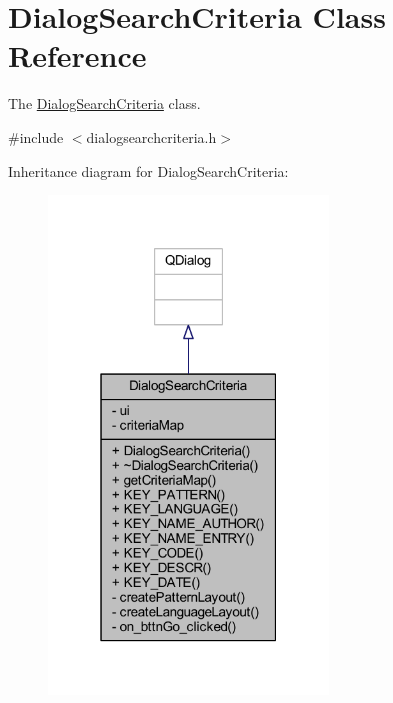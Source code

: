 \hypertarget{class_dialog_search_criteria}{\section{Dialog\+Search\+Criteria Class Reference}
\label{class_dialog_search_criteria}
}


The \hyperlink{class_dialog_search_criteria}{Dialog\+Search\+Criteria} class.  




{\ttfamily \#include $<$dialogsearchcriteria.\+h$>$}



Inheritance diagram for Dialog\+Search\+Criteria\+:
\nopagebreak
\begin{figure}[H]
\begin{center}
\leavevmode
\includegraphics[width=211pt]{class_dialog_search_criteria__inherit__graph}
\end{center}
\end{figure}


